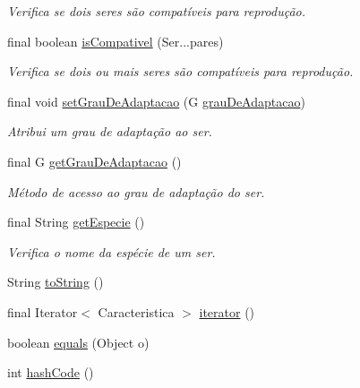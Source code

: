 \begin{DoxyCompactItemize}
\begin{DoxyCompactList}\small\item\em Verifica se dois seres são compatíveis para reprodução. \end{DoxyCompactList}\item 
final boolean \hyperlink{classic_1_1populacional_1_1_ser_3_01_g_01extends_01_number_01_6_comparable_3_01_g_01_4_01_4_a42d457dae7f57ee3c4f94bcdd09cdfe8}{is\-Compativel} (Ser...\-pares)
\begin{DoxyCompactList}\small\item\em Verifica se dois ou mais seres são compatíveis para reprodução. \end{DoxyCompactList}\item 
final void \hyperlink{classic_1_1populacional_1_1_ser_3_01_g_01extends_01_number_01_6_comparable_3_01_g_01_4_01_4_a890693a6828f0b7f79d649f7241c84dc}{set\-Grau\-De\-Adaptacao} (G \hyperlink{classic_1_1populacional_1_1_ser_3_01_g_01extends_01_number_01_6_comparable_3_01_g_01_4_01_4_ae66080e68d6274384056823b7868be0f}{grau\-De\-Adaptacao})
\begin{DoxyCompactList}\small\item\em Atribui um grau de adaptação ao ser. \end{DoxyCompactList}\item 
final G \hyperlink{classic_1_1populacional_1_1_ser_3_01_g_01extends_01_number_01_6_comparable_3_01_g_01_4_01_4_a7db0948d261f1751da314e8edd8ec802}{get\-Grau\-De\-Adaptacao} ()
\begin{DoxyCompactList}\small\item\em Método de acesso ao grau de adaptação do ser. \end{DoxyCompactList}\item 
final String \hyperlink{classic_1_1populacional_1_1_ser_3_01_g_01extends_01_number_01_6_comparable_3_01_g_01_4_01_4_a03bb12b5fc4807d967517345c1de7a7a}{get\-Especie} ()
\begin{DoxyCompactList}\small\item\em Verifica o nome da espécie de um ser. \end{DoxyCompactList}\item 
String \hyperlink{classic_1_1populacional_1_1_ser_3_01_g_01extends_01_number_01_6_comparable_3_01_g_01_4_01_4_a75df7056a0c87d6f32cf15fb6c0d6dc7}{to\-String} ()
\item 
final Iterator$<$ Caracteristica $>$ \hyperlink{classic_1_1populacional_1_1_ser_3_01_g_01extends_01_number_01_6_comparable_3_01_g_01_4_01_4_aeff99d4537187fb5f405a6c466bcaef7}{iterator} ()
\item 
boolean \hyperlink{classic_1_1populacional_1_1_ser_3_01_g_01extends_01_number_01_6_comparable_3_01_g_01_4_01_4_a8843fc4580c79bd13eb9fab5d8a6caf9}{equals} (Object o)
\item 
int \hyperlink{classic_1_1populacional_1_1_ser_3_01_g_01extends_01_number_01_6_comparable_3_01_g_01_4_01_4_a8ea5f714aa0906b42735c7a58ea7e119}{hash\-Code} ()
\end{DoxyCompactItemize}
